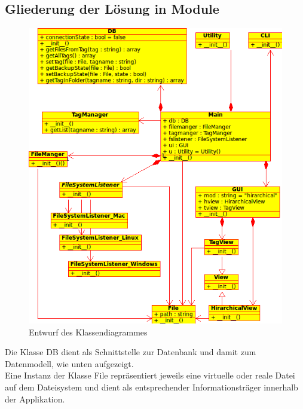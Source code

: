\documentclass[10pt,paper=a4,final]{scrartcl}
\begin{document}
\subsection{Gliederung der L\"osung in Module}
\begin{figure}[h!]
    \includegraphics[scale=1.0]{diag1.png}
   \caption{Entwurf des Klassendiagrammes}
\end{figure}
Die Klasse DB dient als Schnittstelle zur Datenbank und damit zum Datenmodell, wie unten aufgezeigt.\\
Eine Instanz der Klasse File repr\"asentiert jeweils eine virtuelle oder reale Datei auf dem Dateisystem und dient als entsprechender Informationstr\"ager innerhalb der Applikation.
\end{document}
